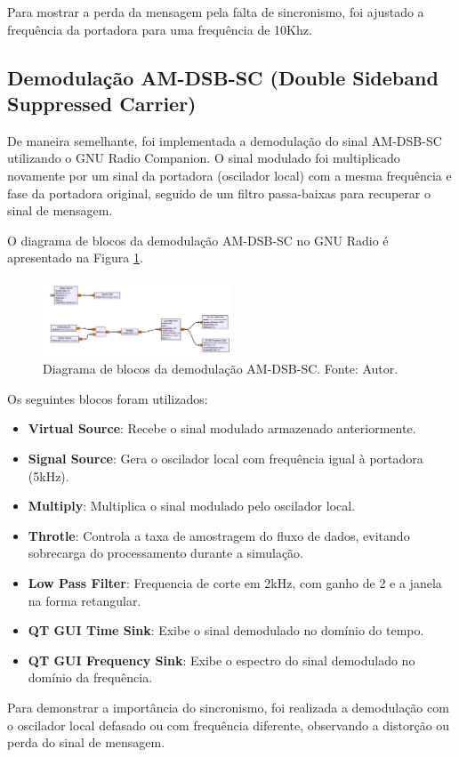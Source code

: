 Para mostrar a perda da mensagem pela falta de sincronismo, foi ajustado a frequência da portadora para uma frequência de 10Khz.

\subsection{Demodulação AM-DSB-SC (Double Sideband Suppressed Carrier)}

De maneira semelhante, foi implementada a demodulação do sinal AM-DSB-SC utilizando o GNU Radio Companion. O sinal modulado foi multiplicado novamente por um sinal da portadora (oscilador local) com a mesma frequência e fase da portadora original, seguido de um filtro passa-baixas para recuperar o sinal de mensagem.

O diagrama de blocos da demodulação AM-DSB-SC no GNU Radio é apresentado na Figura \ref{fig:demodulacao_am_sc_gnu}.

\begin{figure}
    \centering
    \includegraphics[width=0.5\textwidth]{images/demodulacao_gnu_am_dscb_sc.png}
    \caption{Diagrama de blocos da demodulação AM-DSB-SC. Fonte: Autor.}
    \label{fig:demodulacao_am_sc_gnu}
\end{figure}

Os seguintes blocos foram utilizados:

\begin{itemize}
    \item \textbf{Virtual Source}: Recebe o sinal modulado armazenado anteriormente.
    \item \textbf{Signal Source}: Gera o oscilador local com frequência igual à portadora (5kHz).
    \item \textbf{Multiply}: Multiplica o sinal modulado pelo oscilador local.
    \item \textbf{Throtle}: Controla a taxa de amostragem do fluxo de dados, evitando sobrecarga do processamento durante a simulação.
    \item \textbf{Low Pass Filter}: Frequencia de corte em 2kHz, com ganho de 2 e a janela na forma retangular.
    \item \textbf{QT GUI Time Sink}: Exibe o sinal demodulado no domínio do tempo.
    \item \textbf{QT GUI Frequency Sink}: Exibe o espectro do sinal demodulado no domínio da frequência.
\end{itemize}

Para demonstrar a importância do sincronismo, foi realizada a demodulação com o oscilador local defasado ou com frequência diferente, observando a distorção ou perda do sinal de mensagem.

